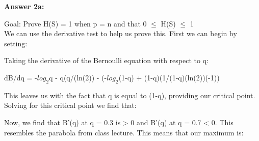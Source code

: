 \documentclass[10pt]{article}
\begin{document}
\begin{flushleft}

\hspace{1 cm}

\textbf{Answer 2a:}

Goal: Prove H(S) = 1 when p = n and that 0 $\le$ H(S) $\le$ 1 \\
We can use the derivative test to help us prove this. First we can begin by setting: \\

\begin{center}


\end{center}


\hspace{1 cm}

Taking the derivative of the Bernoulli equation with respect to q: \\
\hspace{1 cm} 

dB/dq = -$log_2$q - q(q/(ln(2)) - (-$log_2$(1-q) + (1-q)(1/(1-q)(ln(2))(-1))

\hspace{1 cm}

\begin{center}
    

\end{center}

\hspace{1 cm}

This leaves us with the fact that q is equal to (1-q), providing our critical point. Solving for this critical point we find that:

\hspace{1 cm}

\begin{center}


\end{center}

Now, we find that B'(q) at q = 0.3 is > 0 and B'(q) at q = 0.7 < 0. This resembles the parabola from class lecture. This means that our maximum is:
\hspace{1 cm}

\begin{center}


\end{center}



\end{flushleft}
\end{document}
